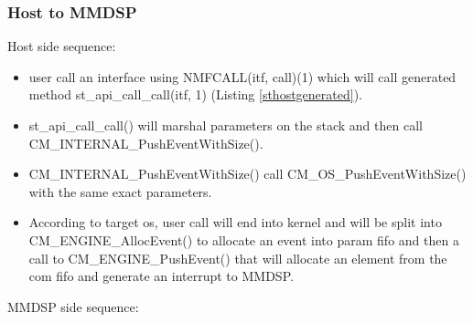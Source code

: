 \subsubsection{Host to MMDSP}
Host side sequence:
\begin{itemize}
  \item user call an interface using NMFCALL(itf, call)(1) which will call
  generated method st\_api\_call\_call(itf, 1) (Listing \ref{sthostgenerated}).
  \item st\_api\_call\_call() will marshal parameters on the stack and then call
  CM\_INTERNAL\_PushEventWithSize().
  \item CM\_INTERNAL\_PushEventWithSize() call CM\_OS\_PushEventWithSize() with
  the same exact parameters.
  \item According to target os, user call will end into kernel and will be split
  into CM\_ENGINE\_AllocEvent() to allocate an event into param fifo and then a
  call to CM\_ENGINE\_PushEvent() that will allocate an element from the com
  fifo and generate an interrupt to MMDSP.
\end{itemize}
MMDSP side sequence:
